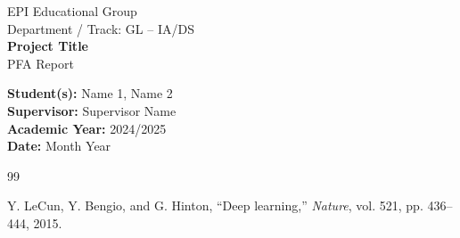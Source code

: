 \documentclass[12pt,a4paper]{report}
\begin{document}
\begin{titlepage}
    \centering
    \vspace*{1cm}

    {\Large EPI Educational Group}\\[0.5cm]
    {\large Department / Track: GL -- IA/DS}\\[2cm]

    {\Huge \textbf{Project Title}}\\[1cm]
    {\Large PFA Report}\\[2cm]

    \begin{flushleft}
    \textbf{Student(s):} Name 1, Name 2\\
    \textbf{Supervisor:} Supervisor Name\\
    \textbf{Academic Year:} 2024/2025\\
    \textbf{Date:} Month Year
    \end{flushleft}

    \vfill
\end{titlepage}




\clearpage
\tableofcontents
\clearpage
\listoffigures
\clearpage
\listoftables
\clearpage  


\clearpage
{}







\begin{thebibliography}{99}
{}

Y. LeCun, Y. Bengio, and G. Hinton, ``Deep learning,'' \textit{Nature}, vol. 521, pp. 436--444, 2015.

\end{thebibliography}

\appendix



\end{document}
